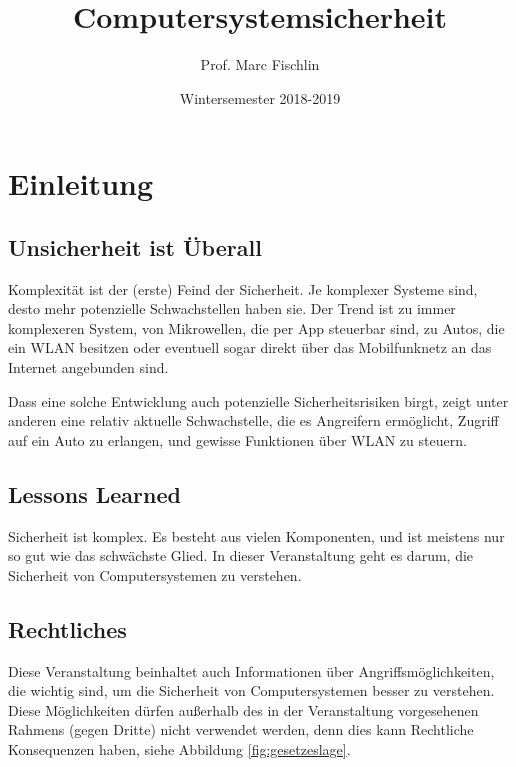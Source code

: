 \documentclass[ngerman]{scrartcl}
\title{Computersystemsicherheit}
\date{Wintersemester 2018-2019}
\author{Prof. Marc Fischlin}
\begin{document}
\maketitle
  
\tableofcontents
\newpage

\section{Einleitung}

\subsection{Unsicherheit ist Überall}

Komplexität ist der (erste) Feind der Sicherheit. Je komplexer Systeme sind, desto mehr potenzielle Schwachstellen haben sie. Der Trend ist zu immer komplexeren System, von Mikrowellen, die per App steuerbar sind, zu Autos, die ein WLAN besitzen oder eventuell sogar direkt über das Mobilfunknetz an das Internet angebunden sind.

Dass eine solche Entwicklung auch potenzielle Sicherheitsrisiken birgt, zeigt unter anderen eine relativ aktuelle Schwachstelle, die es Angreifern ermöglicht, Zugriff auf ein Auto zu erlangen, und gewisse Funktionen über WLAN zu steuern.


\subsection{Lessons Learned}

Sicherheit ist komplex. Es besteht aus vielen Komponenten, und ist meistens nur so gut wie das schwächste Glied. In dieser Veranstaltung geht es darum, die Sicherheit von Computersystemen zu verstehen. 

\subsection{Rechtliches}

Diese Veranstaltung beinhaltet auch Informationen über Angriffsmöglichkeiten, die wichtig sind, um die Sicherheit von Computersystemen besser zu verstehen. Diese Möglichkeiten dürfen außerhalb des in der Veranstaltung vorgesehenen Rahmens (gegen Dritte) nicht verwendet werden, denn dies kann Rechtliche Konsequenzen haben, siehe Abbildung \ref{fig:gesetzeslage}.
\end{document}
